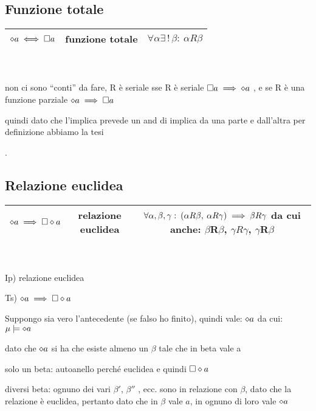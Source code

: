 \subsection{Funzione totale}

\begin{tabular}{|c|c|c|}
\hline 
$\diamond a\iff\square a$  & funzione totale  & $\forall\alpha\exists\,!\,\beta:\:\alpha R\beta$ \tabularnewline
\hline 
\end{tabular}\\
 \\


non ci sono ``conti'' da fare, R è seriale sse R è seriale $\square a\implies\diamond a$
, e se R è una funzione parziale $\diamond a\implies\square a$

quindi dato che l'implica prevede un and di implica da una parte e
dall'altra per definizione abbiamo la tesi

.


\subsection{Relazione euclidea}

\begin{tabular}{|c|c|c|}
\hline 
$\diamond a\implies\square\diamond a$  & relazione euclidea  & $\forall\alpha,\beta,\gamma:\:(\alpha R\beta,\:\alpha R\gamma)\implies\beta R\gamma$
da cui anche: $\beta$R$\beta$, $\gamma R\gamma$, $\gamma$R$\beta$\tabularnewline
\hline 
\end{tabular}\\
 \\


Ip) relazione euclidea

Ts) $\diamond a\implies\square\diamond a$

Suppongo sia vero l'antecedente (se falso ho finito), quindi vale:
$\diamond a$ da cui: $\mu\models\diamond a$

dato che $\diamond a$ si ha che esiste almeno un $\beta$ tale che in beta
vale a

solo un beta: autoanello perché euclidea e quindi $\square\diamond a$

diversi beta: ognuno dei vari $\beta'$, $\beta''$ , ecc. sono in
relazione con $\beta$, dato che la relazione è euclidea, pertanto
dato che in $\beta$ vale $a$, in ognuno di loro vale $\diamond a$ \\



